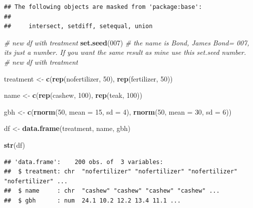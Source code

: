 \documentclass[
]{book}
\newenvironment{Shaded}{\begin{snugshade}}{\end{snugshade}}
\newcommand{\AttributeTok}[1]{\textcolor[rgb]{0.13,0.29,0.53}{#1}}
\newcommand{\CommentTok}[1]{\textcolor[rgb]{0.56,0.35,0.01}{\textit{#1}}}
\newcommand{\DecValTok}[1]{\textcolor[rgb]{0.00,0.00,0.81}{#1}}
\newcommand{\FunctionTok}[1]{\textcolor[rgb]{0.13,0.29,0.53}{\textbf{#1}}}
\newcommand{\NormalTok}[1]{#1}
\newcommand{\OtherTok}[1]{\textcolor[rgb]{0.56,0.35,0.01}{#1}}
\newcommand{\StringTok}[1]{\textcolor[rgb]{0.31,0.60,0.02}{#1}}
\begin{document}
\begin{verbatim}
## The following objects are masked from 'package:base':
## 
##     intersect, setdiff, setequal, union
\end{verbatim}

\begin{Shaded}
\begin{Highlighting}[]
\CommentTok{\# new df with treatment}
\FunctionTok{set.seed}\NormalTok{(}\DecValTok{007}\NormalTok{) }\CommentTok{\# the name is Bond, James Bond= 007, its just a number. If you want the same result as mine use this set.seed number.}
\CommentTok{\# new df with treatment}

\NormalTok{treatment }\OtherTok{\textless{}{-}} \FunctionTok{c}\NormalTok{(}\FunctionTok{rep}\NormalTok{(}\StringTok{\textquotesingle{}nofertilizer\textquotesingle{}}\NormalTok{, }\DecValTok{50}\NormalTok{), }
               \FunctionTok{rep}\NormalTok{(}\StringTok{\textquotesingle{}fertilizer\textquotesingle{}}\NormalTok{, }\DecValTok{50}\NormalTok{))}

\NormalTok{name }\OtherTok{\textless{}{-}} \FunctionTok{c}\NormalTok{(}\FunctionTok{rep}\NormalTok{(}\StringTok{\textquotesingle{}cashew\textquotesingle{}}\NormalTok{, }\DecValTok{100}\NormalTok{), }
          \FunctionTok{rep}\NormalTok{(}\StringTok{\textquotesingle{}teak\textquotesingle{}}\NormalTok{, }\DecValTok{100}\NormalTok{))}

\NormalTok{gbh }\OtherTok{\textless{}{-}} \FunctionTok{c}\NormalTok{(}\FunctionTok{rnorm}\NormalTok{(}\DecValTok{50}\NormalTok{,}
             \AttributeTok{mean =} \DecValTok{15}\NormalTok{,}
             \AttributeTok{sd =} \DecValTok{4}\NormalTok{),}
         \FunctionTok{rnorm}\NormalTok{(}\DecValTok{50}\NormalTok{,}
               \AttributeTok{mean =} \DecValTok{30}\NormalTok{,}
               \AttributeTok{sd =} \DecValTok{6}\NormalTok{))}

\NormalTok{df }\OtherTok{\textless{}{-}} \FunctionTok{data.frame}\NormalTok{(treatment, }
\NormalTok{                 name, }
\NormalTok{                 gbh)}

\FunctionTok{str}\NormalTok{(df)}
\end{Highlighting}
\end{Shaded}

\begin{verbatim}
## 'data.frame':    200 obs. of  3 variables:
##  $ treatment: chr  "nofertilizer" "nofertilizer" "nofertilizer" "nofertilizer" ...
##  $ name     : chr  "cashew" "cashew" "cashew" "cashew" ...
##  $ gbh      : num  24.1 10.2 12.2 13.4 11.1 ...
\end{verbatim}
\end{document}
